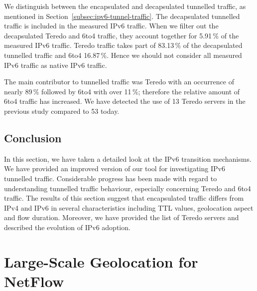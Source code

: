 We distinguish between the encapsulated and decapsulated tunnelled traffic, as mentioned in Section~\ref{subsec:ipv6-tunnel-traffic}. The decapsulated tunnelled traffic is included in the measured IPv6 traffic. When we filter out the decapsulated Teredo and 6to4 traffic, they account together for 5.91\,\% of the measured IPv6 traffic. Teredo traffic takes part of 83.13\,\% of the decapsulated tunnelled traffic and 6to4 16.87\,\%. Hence we should not consider all measured IPv6 traffic as native IPv6 traffic.

The main contributor to tunnelled traffic was Teredo with an occurrence of nearly 89\,\% followed by 6to4 with over 11\,\%; therefore the relative amount of 6to4 traffic has increased. We have detected the use of 13 Teredo servers in the previous study compared to 53 today. %

\subsection{Conclusion} \label{subsec:ipv6-tunnels-conclusion}

In this section, we have taken a detailed look at the IPv6 transition mechanisms. We have provided an improved version of our tool for investigating IPv6 tunnelled traffic. Considerable progress has been made with regard to understanding tunnelled traffic behaviour, especially concerning Teredo and 6to4 traffic. The results of this section suggest that encapsulated traffic differs from IPv4 and IPv6 in several characteristics including TTL values, geolocation aspect and flow duration. Moreover, we have provided the list of Teredo servers and described the evolution of IPv6 adoption.



\section{Large-Scale Geolocation for NetFlow}\label{sec:analysis-geolocation}

